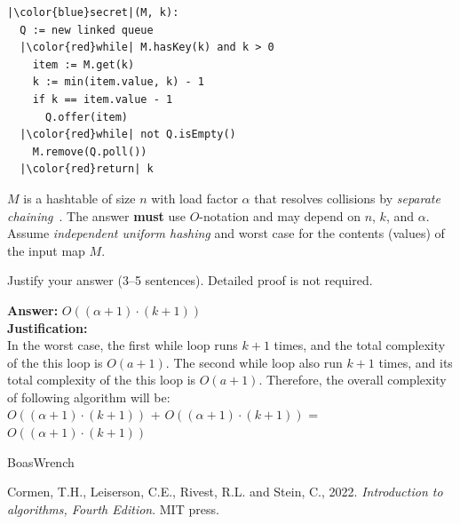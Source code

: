 \documentclass[dvipsnames]{article}
\begin{document}
\begin{enumerate}
    \begin{verbatim}
|\color{blue}secret|(M, k):
  Q := new linked queue
  |\color{red}while| M.hasKey(k) and k > 0
    item := M.get(k)
    k := min(item.value, k) - 1
    if k == item.value - 1
      Q.offer(item)
  |\color{red}while| not Q.isEmpty()
    M.remove(Q.poll())
  |\color{red}return| k
    \end{verbatim}

    $M$ is a hashtable of size $n$ with load factor $\alpha$ that resolves collisions by
    \emph{separate chaining}~\cite[\S 11.2]{Cormen2022}.
    The answer \textbf{must} use $O$-notation and may depend on $n$, $k$, and $\alpha$.
    Assume \emph{independent uniform hashing} and worst case for the contents (values) of the input map $M$.

    Justify your answer (3--5 sentences). Detailed proof is not required.

    \color{blue}
    \textbf{Answer:} \emph{$O((\alpha+1)\cdot (k+1))$} \\
    \textbf{Justification: }\\ In the worst case, the first while loop runs $k+1$ times, and the total complexity of the this loop is $O(a+1)$. The second while loop also run $k+1$ times, and its total complexity of the this loop is $O(a+1)$. Therefore, the overall complexity of following algorithm will be:\\
    
    \centering$O((\alpha+1)\cdot (k+1))$ + $O((\alpha+1)\cdot (k+1))$ = $O((\alpha+1)\cdot (k+1))$\\
    \color{black}

\end{enumerate}

\begin{thebibliography}{BoasWrench}

Cormen, T.H., Leiserson, C.E., Rivest, R.L. and Stein, C., 2022. \emph{Introduction to algorithms, Fourth Edition}. MIT press.

\end{thebibliography}
\end{document}
